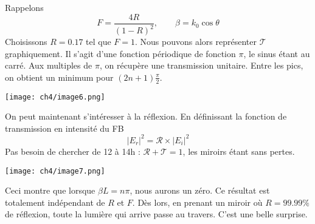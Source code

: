 Rappelons 
\begin{equation}
F = \dfrac{4R}{(1-R)^2},\qquad \beta = k_0\cos\theta
\end{equation}
Choisissons $R=0.17$ tel que $F = 1$. Nous pouvons alors représenter $\mathcal{T}$ 
graphiquement. Il s'agit d'une fonction périodique de fonction $\pi$, le sinus étant 
au carré. Aux multiples de $\pi$, on récupère une transmission unitaire. Entre les pics, on 
obtient un minimum pour $(2n+1)\frac{\pi}{2}$.  

\begin{center}
	\texttt{[image: ch4/image6.png]}
\end{center}

On peut maintenant s'intéresser à la réflexion. En définissant la fonction de transmission 
en intensité du FB 
\begin{equation}
|E_r|^2 = \mathcal{R}\times|E_i|^2
\end{equation}
Pas besoin de chercher de 12 à 14h : $\mathcal{R}+\mathcal{T}=1$, les miroirs étant sans 
pertes. 

\begin{center}
	\texttt{[image: ch4/image7.png]}
\end{center}

Ceci montre que lorsque $\beta L = n\pi$, nous aurons un zéro. Ce résultat est totalement 
indépendant de $R$ et $F$. Dès lors, en prenant un miroir où $R=99.99\%$ de réflexion, 
toute la lumière qui arrive passe au travers. C'est une belle surprise. 






































